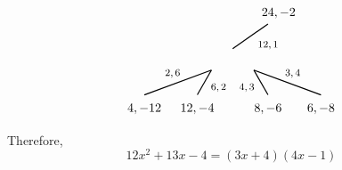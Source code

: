 \documentclass[11pt,letterpaper]{article}
\begin{document}
\[\begin{tikzpicture}
	\node at (1,0.4) {\footnotesize$12, 1$};
	\draw[line width=0.03cm] (0,0.3) -- (1,1);
	\node at (1.3,1.3) {$24, -2$};
	
	\node at (-1.7,-0.4) {\footnotesize$2, 6$};
	\draw[line width=0.03cm,label={1}] (-0.6,-0.3) -- (-2.5,-1);
	\node at (-2.5,-1.4) {$4, -12$};
	
	\node at (-0.4,-0.8) {\footnotesize$6, 2$};
	\draw[line width=0.03cm,label={1}] (-0.6,-0.3) -- (-1,-1);
	\node at (-1,-1.4) {$12, -4$};
	
	\node at (1.7,-0.4) {\footnotesize$3, 4$};
	\draw[line width=0.03cm,label={1}] (0.6,-0.3) -- (2.5,-1);
	\node at (2.5,-1.4) {$6, -8$};

	\node at (0.4,-0.8) {\footnotesize$4, 3$};
	\draw[line width=0.03cm,label={1}] (0.6,-0.3) -- (1,-1);
	\node at (1,-1.4) {$8, -6$};


	\end{tikzpicture}
	\]

Therefore, 
	\[
	12x^2 + 13x - 4= (3x + 4)(4x - 1)
	\]


\end{document}
